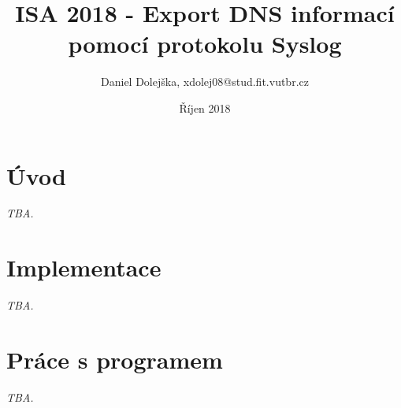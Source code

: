 \documentclass{article}
\title{ISA 2018 - Export DNS informací pomocí protokolu Syslog}
\author{Daniel Dolejška, \textsf{xdolej08@stud.fit.vutbr.cz}}
\date{Říjen 2018}
\begin{document}
    \maketitle
    \tableofcontents

    \newpage
    \section{Úvod}
    \textit{TBA.}

    \section{Implementace}
    \textit{TBA.}

    \section{Práce s programem}
    \textit{TBA.}
\end{document}
